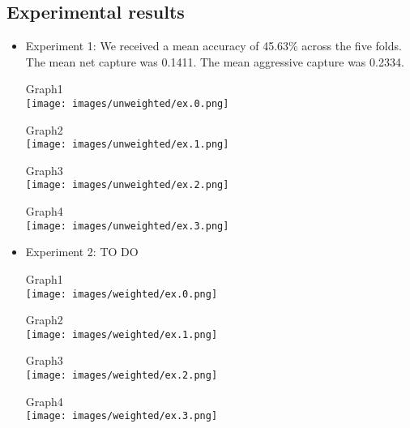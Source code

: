 \documentclass[11pt,letterpaper]{article}
\newcommand{\blue}[1]{\textcolor{RoyalBlue}{#1}}
\newcommand{\instructions}[1]{\blue{\textit{#1}}}
\begin{document}
\subsection{Experimental results}
\label{sec:experimental-results}
\begin{itemize}
\item Experiment 1: We received a mean accuracy of 45.63\% across the five folds.
  The mean net capture was 0.1411. The mean aggressive capture was 0.2334.
  
  Graph1 \\
  
\texttt{[image: images/unweighted/ex.0.png]}

  Graph2 \\
  
\texttt{[image: images/unweighted/ex.1.png]}

  Graph3 \\
  
\texttt{[image: images/unweighted/ex.2.png]}

  Graph4 \\
  
\texttt{[image: images/unweighted/ex.3.png]}
  
\item Experiment 2: TO DO
  
  Graph1 \\
  
\texttt{[image: images/weighted/ex.0.png]}

  Graph2 \\
  
\texttt{[image: images/weighted/ex.1.png]}

  Graph3 \\
  
\texttt{[image: images/weighted/ex.2.png]}

  Graph4 \\
  
\texttt{[image: images/weighted/ex.3.png]}

\end{itemize}
\end{document}
